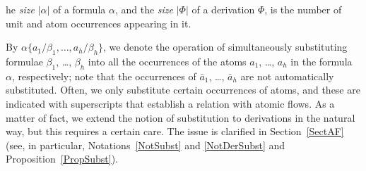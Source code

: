 \newcommand{\size}[1]{{\left\vert #1\right\vert}}\vlupdate\size
The \emph{size} $\size\alpha$ of a formula $\alpha$, and the \emph{size} $\size\Phi$ of a derivation $\Phi$, is the number of unit and atom occurrences appearing in it.

By $\alpha\{a_1/\beta_1,\dots,a_h/\beta_h\}$, we denote the operation of simultaneously substituting formulae $\beta_1$, \dots, $\beta_h$ into all the occurrences of the atoms $a_1$, \dots, $a_h$ in the formula $\alpha$, respectively; note that the occurrences of $\bar a_1$, \dots, $\bar a_h$ are not automatically substituted. Often, we only substitute certain occurrences of atoms, and these are indicated with superscripts that establish a relation with atomic flows. As a matter of fact, we extend the notion of substitution to derivations in the natural way, but this requires a certain care. The issue is clarified in Section~\ref{SectAF} (see, in particular, Notations~\ref{NotSubst} and \ref{NotDerSubst} and Proposition~\ref{PropSubst}).

